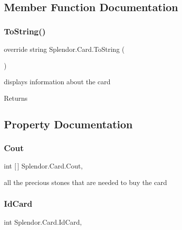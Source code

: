 \subsection{Member Function Documentation}
\mbox{\label{class_splendor_1_1_card_a3403c28ee02b119ee5aae5bd10eee468}} 
\subsubsection{\texorpdfstring{To\+String()}{ToString()}}
{\footnotesize\ttfamily override string Splendor.\+Card.\+To\+String (\begin{DoxyParamCaption}{ }\end{DoxyParamCaption})}



displays information about the card 

\begin{DoxyReturn}{Returns}

\end{DoxyReturn}


\subsection{Property Documentation}
\mbox{\label{class_splendor_1_1_card_af3c65d4d543f453d5c481682233745c7}} 
\subsubsection{\texorpdfstring{Cout}{Cout}}
{\footnotesize\ttfamily int \mbox{[}$\,$\mbox{]} Splendor.\+Card.\+Cout\hspace{0.3cm}{\ttfamily [get]}, {\ttfamily [set]}}



all the precious stones that are needed to buy the card 

\mbox{\label{class_splendor_1_1_card_a1ea37cdd596ce83ac8090a5fb19dcd0e}} 
\subsubsection{\texorpdfstring{Id\+Card}{IdCard}}
{\footnotesize\ttfamily int Splendor.\+Card.\+Id\+Card\hspace{0.3cm}{\ttfamily [get]}, {\ttfamily [set]}}

